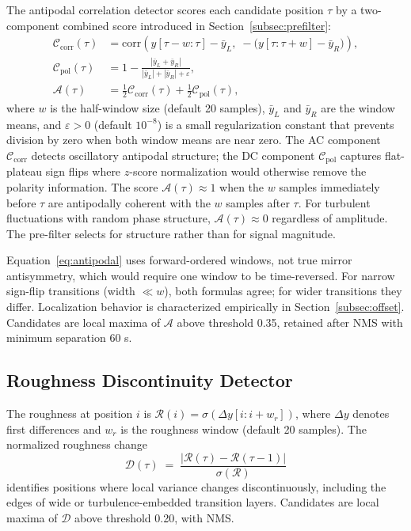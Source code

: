 \documentclass[12pt,letterpaper]{article}
\begin{document}
The antipodal correlation detector scores each candidate position $\tau$ by a
two-component combined score introduced in Section~\ref{subsec:prefilter}:
\begin{align}
  \mathcal{C}_{\mathrm{corr}}(\tau) &= \mathrm{corr}\!\left(y[\tau-w:\tau] - \bar{y}_L,\;
    -\bigl(y[\tau:\tau+w] - \bar{y}_R\bigr)\right),
  \label{eq:antipodal_ac}\\
  \mathcal{C}_{\mathrm{pol}}(\tau)  &= 1 - \frac{|\bar{y}_L + \bar{y}_R|}{|\bar{y}_L| + |\bar{y}_R| + \varepsilon},
  \label{eq:antipodal_dc}\\
  \mathcal{A}(\tau) &= \tfrac{1}{2}\mathcal{C}_{\mathrm{corr}}(\tau)
                      + \tfrac{1}{2}\mathcal{C}_{\mathrm{pol}}(\tau),
  \label{eq:antipodal}
\end{align}
where $w$ is the half-window size (default 20 samples), $\bar{y}_L$ and
$\bar{y}_R$ are the window means, and $\varepsilon > 0$ (default $10^{-8}$) is
a small regularization constant that prevents division by zero when both window
means are near zero.
The AC component $\mathcal{C}_{\mathrm{corr}}$ detects oscillatory antipodal
structure; the DC component $\mathcal{C}_{\mathrm{pol}}$ captures flat-plateau
sign flips where $z$-score normalization would otherwise remove the polarity
information.
The score $\mathcal{A}(\tau) \approx 1$ when the $w$ samples immediately
before $\tau$ are antipodally coherent with the $w$ samples after $\tau$.
For turbulent fluctuations with random phase structure,
$\mathcal{A}(\tau) \approx 0$ regardless of amplitude.
The pre-filter selects for structure rather than for signal magnitude.

Equation~\eqref{eq:antipodal} uses forward-ordered windows, not true mirror
antisymmetry, which would require one window to be time-reversed.
For narrow sign-flip transitions (width $\ll w$), both formulas agree;
for wider transitions they differ.
Localization behavior is characterized empirically in
Section~\ref{subsec:offset}.
Candidates are local maxima of $\mathcal{A}$ above threshold 0.35, retained
after NMS with minimum separation 60 s.

\subsection{Roughness Discontinuity Detector}
\label{subsec:roughness}

The roughness at position $i$ is $\mathcal{R}(i) = \sigma(\Delta y[i:i+w_r])$,
where $\Delta y$ denotes first differences and $w_r$ is the roughness window
(default 20 samples).
The normalized roughness change
\begin{equation}
  \mathcal{D}(\tau) \;=\;
    \frac{|\mathcal{R}(\tau) - \mathcal{R}(\tau-1)|}{\sigma(\mathcal{R})}
  \label{eq:roughness}
\end{equation}
identifies positions where local variance changes discontinuously, including
the edges of wide or turbulence-embedded transition layers.
Candidates are local maxima of $\mathcal{D}$ above threshold 0.20, with NMS.
\end{document}
